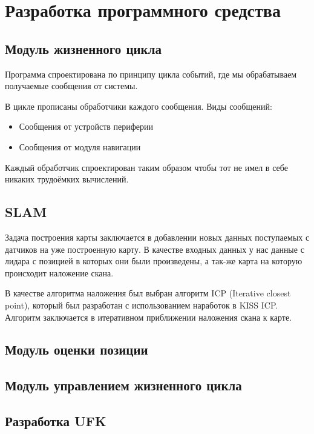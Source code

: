 \section{Разработка программного средства}

\subsection{Модуль жизненного цикла}
Программа спроектирована по принципу цикла событий, где мы обрабатываем получаемые сообщения от системы.

В цикле прописаны обработчики каждого сообщения.
Виды сообщений:
\begin{itemize}
	\item Сообщения от устройств периферии
	\item Сообщения от модуля навигации
\end{itemize}

Каждый обработчик спроектирован таким образом чтобы тот не имел в себе никаких трудоёмких вычислений.

\subsection{SLAM}
Задача построения карты заключается в добавлении новых данных поступаемых с датчиков на уже построенную карту.
В качестве входных данных у нас данные с лидара с позицией в которых они были произведены, а так-же карта на которую происходит наложение скана.

В качестве алгоритма наложения был выбран алгоритм ICP (Iterative closest point), который был разработан с использованием наработок в KISS ICP.
Алгоритм заключается в итеративном приближении наложения скана к карте.

\subsection{Модуль оценки позиции}

\subsection{Модуль управлением жизненного цикла}





\subsection{Разработка UFK}



